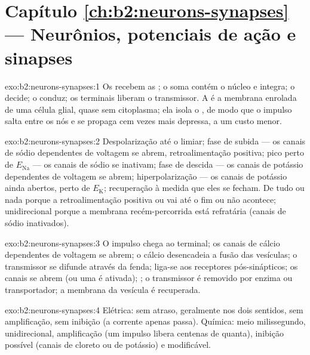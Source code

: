 \section*{Capítulo \ref{ch:b2:neurons-synapses} --- Neurônios, potenciais de ação e sinapses}

\begin{solution}{exo:b2:neurons-synapses:1}
Os  recebem as ; o soma contém o núcleo e integra; o
 decide; o  conduz; os terminais liberam o
transmissor. A  é a membrana enrolada de uma célula glial, quase
sem citoplasma; ela isola o , de modo que o impulso salta entre os
nós e se propaga cem vezes mais depressa, a um custo menor.
\end{solution}

\begin{solution}{exo:b2:neurons-synapses:2}
Despolarização até o limiar; fase de subida --- os canais de sódio
dependentes de voltagem se abrem, retroalimentação positiva; pico perto
de $E_{\mathrm{Na}}$ --- os canais de sódio se inativam; fase de descida
--- os canais de potássio dependentes de voltagem se abrem;
hiperpolarização --- os canais de potássio ainda abertos, perto de
$E_{\mathrm K}$; recuperação à medida que eles se fecham. De tudo ou
nada porque a retroalimentação positiva ou vai até o fim ou não
acontece; unidirecional porque a membrana recém-percorrida está
refratária (canais de sódio inativados).
\end{solution}

\begin{solution}{exo:b2:neurons-synapses:3}
O impulso chega ao terminal; os canais de cálcio dependentes de voltagem
se abrem; o cálcio desencadeia a fusão das vesículas; o transmissor se
difunde através da fenda; liga-se aos receptores pós-sinápticos; os
canais se abrem (ou uma  é ativada); ;
o transmissor é removido por enzima ou transportador; a membrana da
vesícula é recuperada.
\end{solution}

\begin{solution}{exo:b2:neurons-synapses:4}
Elétrica: sem atraso, geralmente nos dois sentidos, sem amplificação,
sem inibição (a corrente apenas passa). Química: meio milissegundo,
unidirecional, amplificação (um impulso libera centenas de quanta),
inibição possível (canais de cloreto ou de potássio) e modificável.
\end{solution}

